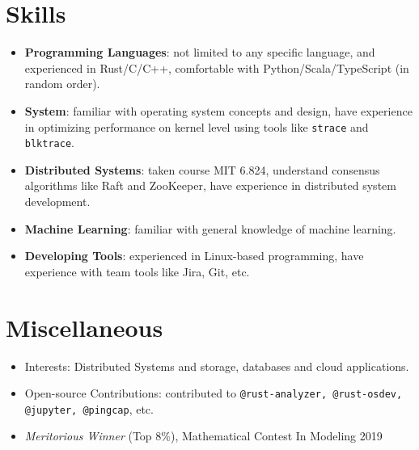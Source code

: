 \documentclass{resume}
\newcommand{\en}[1]{#1}
\newcommand{\zh}[1]{}
\begin{document}
\section{\en{Skills}\zh{技能}}
\begin{itemize}[parsep=0.25ex]
      \item \en{\textbf{Programming Languages}:
                  not limited to any specific language,
                  and experienced in Rust/C/C++,
                  comfortable with Python/Scala/TypeScript (in random order).}
            \zh{\textbf{编程语言}:
                  不局限于特定编程语言，且尤其熟悉 Rust/C/C++ 等，
                  了解 Python/Scala/TypeScript 等（不分先后）。}

      \item \en{\textbf{System}:
                  familiar with operating system concepts and design,
                  have experience in optimizing performance on kernel level using tools
                  like \texttt{strace} and \texttt{blktrace}.}
            \zh{\textbf{系统}:
                  熟悉各种操作系统内核的概念与设计，熟悉各种内核性能调优工具，例如 \texttt{strace} 和 \texttt{blktrace}。}

      \item \en{\textbf{Distributed Systems}:
                  taken course MIT 6.824,
                  understand consensus algorithms like Raft and ZooKeeper,
                  have experience in distributed system development.}
            \zh{\textbf{分布式系统}:
                  熟悉 ZooKeeper 与 Raft 算法，有分布式系统开发经验。}

      \item \en{\textbf{Machine Learning}:
                  familiar with general knowledge of machine learning.}
            \zh{\textbf{机器学习}:
                  熟悉经典机器学习算法。}

      \item \en{\textbf{Developing Tools}:
                  experienced in Linux-based programming,
                  have experience with team tools like Jira, Git, etc.}
            \zh{\textbf{开发工具}:
                  十分熟悉 Linux，有 Jira、Git 等团队合作工具的经验。}
\end{itemize}

\section{\en{Miscellaneous}\zh{其他}}
\begin{itemize}
      \item \en{Interests: Distributed Systems and storage, databases and cloud applications.}
            \zh{兴趣：分布式系统、存储、数据库、云计算应用等。}
      \item \en{Open-source Contributions: contributed to \texttt{@rust-analyzer, @rust-osdev, @jupyter, @pingcap}, etc.}
            \zh{开源贡献: 为 \texttt{@rust-analyzer, @rust-osdev, @jupyter, @pingcap} 等组织贡献过代码。}
      \item \textit{Meritorious Winner} (Top 8\%), Mathematical Contest In Modeling 2019
\end{itemize}
\end{document}
